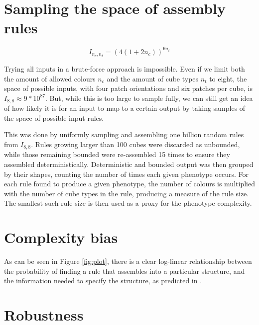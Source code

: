 \section{Sampling the space of assembly rules}

\[
I_{n_c, n_t} = (4(1+2n_c))^{6n_t}
\]

Trying all inputs in a brute-force approach is impossible. Even if we limit both the amount of allowed colours \(n_c\) and the amount of cube types \(n_t\) to eight, the space of possible inputs, with four patch orientations and six patches per cube, is \(I_{8, 8} \approx 9*10^{87}\).
But, while this is too large to sample fully, we can still get an idea of how likely it is for an input to map to a certain output by taking samples of the space of possible input rules.

This was done by uniformly sampling and assembling one billion random rules from \(I_{8, 8}\). Rules growing larger than 100 cubes were discarded as unbounded, while those remaining bounded were re-assembled 15 times to ensure they assembled deterministically. Deterministic and bounded output was then grouped by their shapes, counting the number of times each given phenotype occurs. For each rule found to produce a given phenotype, the number of colours is multiplied with the number of cube types in the rule, producing a measure of the rule size. The smallest such rule size is then used as a proxy for the phenotype complexity.  

\section{Complexity bias}

As can be seen in Figure \ref{fig:plot}, there is a clear log-linear relationship between the probability of finding a rule that assembles into a particular structure, and the information needed to specify the structure, as predicted in \cite{dingle2018input, dingle2020generic}.

\section{Robustness}
